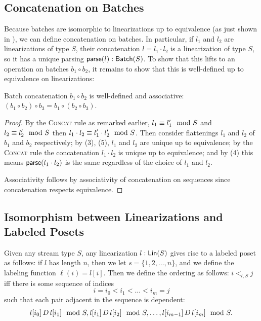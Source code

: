 \subsection{Concatenation on Batches}

Because batches are isomorphic to linearizations up to equivalence (as just shown in ), we can define concatenation on batches. In particular, if $l_1$ and $l_2$ are linearizations of type $S$,
their concatenation $l = l_1 \cdot l_2$ is a linearization of type $S$,
so it has a unique parsing $\mathsf{parse}(l): \mathsf{Batch}({S})$.
To show that this lifts to an operation on batches $b_1 \circ b_2$, it remains to show that this is well-defined up to equivalence on linearizations:
\begin{proposition}
\label{batch-concatenation-well-defined}
Batch concatenation $b_1 \circ b_2$ is well-defined and associative: $(b_1 \circ b_2) \circ b_3 = b_1 \circ (b_2 \circ b_3)$.
\end{proposition}
\begin{proof}
By the \textsc{Concat} rule as remarked earlier, $l_1 \equiv l_1' \mod {S}$ and $l_2 \equiv l_2' \mod {S}$
then $l_1 \cdot l_2 \equiv l_1' \cdot l_2' \mod {S}$.
Then consider flattenings $l_1$ and $l_2$ of $b_1$ and $b_2$ respectively;
by  (3), (5),
$l_1$ and $l_2$ are unique up to equivalence;
by the \textsc{Concat} rule the concatenation $l_1 \cdot l_2$ is unique up to equivalence;
and by  (4)
this means $\mathsf{parse}(l_1 \cdot l_2)$ is the same regardless of the choice of $l_1$ and $l_2$.

Associativity follows by associativity of concatenation on sequences since concatenation respects equivalence.
\end{proof}

\subsection{Isomorphism between Linearizations and Labeled Posets}

Given any stream type $S$, any linearization $l: \mathsf{Lin}({S})$ gives rise to a labeled poset as follows:
if $l$ has length $n$, then we let $s = \{1, 2, \ldots, n\}$, and we define the labeling function $\ell(i) = l[i]$.
Then we define the ordering as follows:
$i <_{l, S} j$ iff there is some sequence of indices
\[
i = i_0 < i_1 < \ldots < i_m = j
\]
such that each pair adjacent in the sequence is dependent:
\[
l[i_0] \,D\, l[i_1] \mod {S}, l[i_1] \,D\, l[i_2] \mod {S}, \ldots, l[i_{m-1}] \,D\, l[i_m] \mod {S}.
\]

